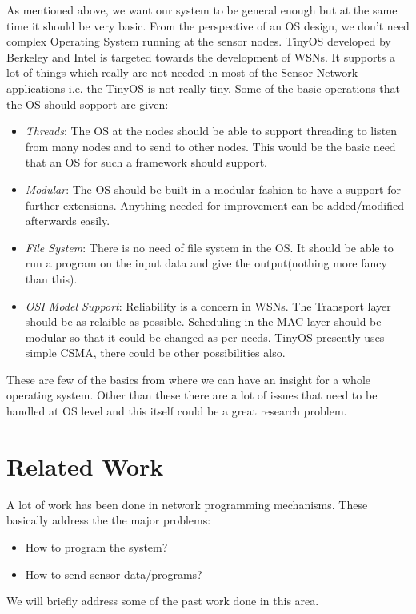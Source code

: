 \documentclass[twocolumn]{article}
\begin{document}
As mentioned above, we want our system to be general enough but at the same time it should be very basic. From the perspective of an OS design, we don't need complex Operating System running at the sensor nodes. TinyOS developed by Berkeley and Intel is targeted towards the development of WSNs. It supports a lot of things which really are not needed in most of the Sensor Network applications i.e. the TinyOS is not really tiny. Some of the basic operations that the OS should sopport are given:
\begin{itemize}
\item \emph{Threads}: The OS at the nodes should be able to support threading to listen from many nodes and to send to other nodes. This would be the basic need that an OS for such a framework should support.

\item \emph{Modular}: The OS should be built in a modular fashion to have a support for further extensions. Anything needed for improvement can be added/modified afterwards easily.

\item \emph{File System}: There is no need of file system in the OS. It should be able to run a program on the input data and give the output(nothing more fancy than this).

\item \emph{OSI Model Support}: Reliability is a concern in WSNs. The Transport layer should be as relaible as possible. Scheduling in the MAC layer should be modular so that it could be changed as per needs. TinyOS presently uses simple CSMA, there could be other possibilities also.
\end{itemize}

These are few of the basics from where we can have an insight for a whole operating system. Other than these there are a lot of issues that need to be handled at OS level and this itself could be a great research problem.

\section{Related Work}

A lot of work has been done in network programming mechanisms. These basically address the the major problems:
\begin{itemize}
\item How to program the system?
\item How to send sensor data/programs?
\end{itemize}
We will briefly address some of the past work done in this area.
\end{document}
